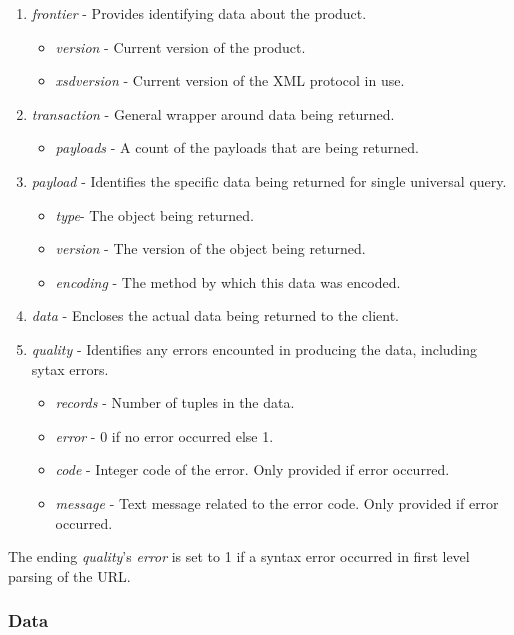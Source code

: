 \begin{enumerate}
\item \emph{frontier} - Provides identifying data about the product.
\begin{itemize}
\item \emph{version} - Current version of the product.
\item \emph{xsdversion} - Current version of the XML protocol in use.
\end{itemize}
\item \emph{transaction} - General wrapper around data being returned.
\begin{itemize}
\item \emph{payloads} - A count of the payloads that are being returned.
\end {itemize} 
\item \emph{payload} - Identifies the specific data being returned for single
universal query.
\begin{itemize}
\item \emph{type}- The object being returned.
\item \emph{version} - The version of the object being returned.
\item \emph{encoding} - The method by which this data was encoded.
\end {itemize}
\item \emph{data} - Encloses the actual data being returned to the client.
\item \emph{quality} - Identifies any errors encounted in producing the data, including sytax errors.
\begin{itemize}
\item \emph{records} - Number of tuples in the data.
\item \emph{error} - 0 if no error occurred else 1. 
\item \emph{code} - Integer code of the error. Only provided if error occurred.
\item \emph{message} - Text message related to the error code. Only provided if error occurred.
\end {itemize}
\end{enumerate}

The ending \emph{quality}'s \emph{error} is set to 1 if a syntax error occurred in first level parsing of the URL.  

\subsubsection{Data}


